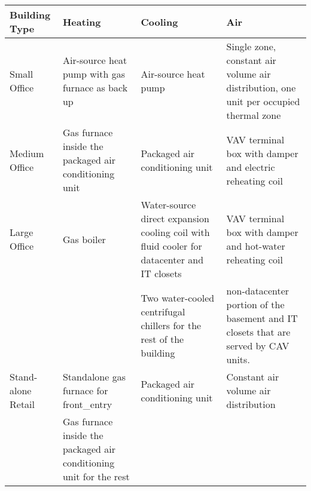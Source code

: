 \pagebreak
\begin{table}[h!]
\centering
\tiny
\caption{Benchmark Building HVAC System}
\label{tab:hvac}
\begin{longtable}{p{2cm}|p{2cm}|p{4cm}|p{4cm}}
  \hline
  Building Type                & Heating                                                                         & Cooling                                                                      & Air                                                                                                                                                                    \\
  \hline
  \hline
  Small Office                 & Air-source heat pump with gas furnace as back up                                & Air-source heat pump                                                         & Single zone, constant air volume air distribution, one unit per occupied thermal zone                                                                                  \\
  \hline
  Medium Office                & Gas furnace inside the packaged air conditioning unit                           & Packaged air conditioning unit                                               & VAV terminal box with damper and electric reheating coil                                                                                                               \\
  \hline
  Large Office                 & Gas boiler                                                                      & Water-source direct expansion cooling coil with fluid cooler for datacenter and IT closets & VAV terminal box with damper and hot-water reheating coil                                                                                                              \\
                               &                                                                                 & Two water-cooled centrifugal chillers for the rest of the building           & non-datacenter portion of the basement and IT closets that are served by CAV units.                                                                                    \\
  \hline
  Stand-alone Retail           & Standalone gas furnace for front\_entry                                         & Packaged air conditioning unit                                               & Constant air volume air distribution                                                                                                                                   \\ & Gas furnace inside the packaged air conditioning unit for the rest              &                                                                              &                                                                                                                                                                        \\

\end{longtable}
\end{table}
